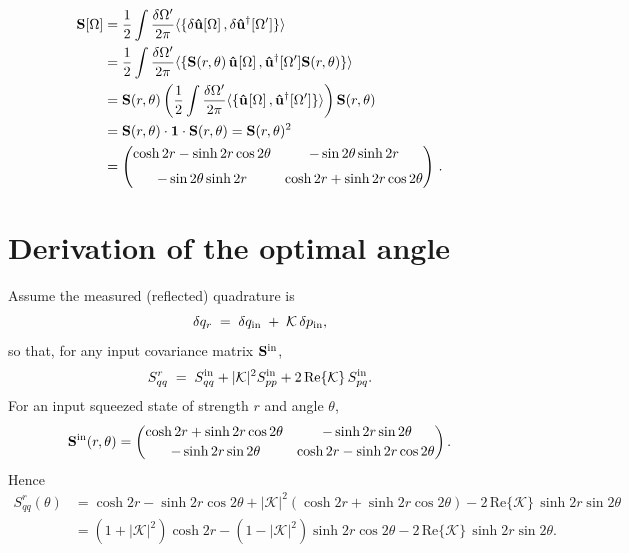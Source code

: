 \begin{align*}
  \mathbf{S}[\Omega] & =  \dfrac{1}{2}  \int \dfrac{\delta \Omega'}{2\pi} \langle\{  \delta \mathbf{\hat{u}}{\vphantom{\dagger}}[\Omega]\, , \delta \mathbf{\hat{u}}^{\dagger}[\Omega'] \}  \rangle \\
  & =  \dfrac{1}{2}  \int \dfrac{\delta \Omega'}{2\pi} \langle\{  \mathbf{S}(r, \theta) \, \mathbf{\hat{u}}^{\vphantom{\dagger}}[\Omega]\, ,  \mathbf{\hat{u}}^{\dagger}[\Omega']  \mathbf{S}(r, \theta) \}  \rangle \\
  & =  \mathbf{S}(r, \theta)  \left(  \dfrac{1}{2}  \int \dfrac{\delta \Omega'}{2\pi} \langle\{   \mathbf{\hat{u}}^{\vphantom{\dagger}}[\Omega]\, ,  \mathbf{\hat{u}}^{\dagger}[\Omega']  \}  \rangle \right)  \mathbf{S}(r, \theta)  \\
  & =  \mathbf{S}(r, \theta)  \cdot \mathbf{1}  \cdot  \mathbf{S}(r, \theta)  =  \mathbf{S}(r, \theta)^2 \\
  & = \begin{pmatrix}
  \cosh 2r - \sinh 2r \cos 2\theta & - \sin 2\theta \sinh 2r \\[6pt]
  - \sin 2\theta \sinh 2r & \cosh 2r + \sinh 2r \cos 2\theta \\
  \end{pmatrix} \,.
\end{align*}


\section*{Derivation of the optimal angle}

Assume the measured (reflected) quadrature is
\[
\delta q_r \;=\; \delta q_{\rm in} \;+\; \mathcal{K}\,\delta p_{\rm in},
\]
so that, for any input covariance matrix \(\mathbf{S}^{\rm in}\),
\[
S^{r}_{qq} \;=\; S^{\rm in}_{qq} + |\mathcal{K}|^{2}S^{\rm in}_{pp} + 2\,\mathrm{Re}\{\mathcal{K}\}\,S^{\rm in}_{pq}.
\]
For an input squeezed state of strength \(r\) and angle \(\theta\),
\[
\mathbf{S}^{\rm in}(r,\theta)=
\begin{pmatrix}
\cosh 2r + \sinh 2r \cos 2\theta & \,-\sinh 2r \sin 2\theta\\[2pt]
\,-\sinh 2r \sin 2\theta & \cosh 2r - \sinh 2r \cos 2\theta
\end{pmatrix}.
\]
Hence
\begin{align}
S^{r}_{qq}(\theta)
&= \cosh 2r - \sinh 2r \cos 2\theta
 + |\mathcal{K}|^{2}\!\left(\cosh 2r + \sinh 2r \cos 2\theta\right)
 - 2\,\mathrm{Re}\{\mathcal{K}\}\,\sinh 2r \sin 2\theta \nonumber\\[2pt]
&= (1+|\mathcal{K}|^{2})\cosh 2r
  - (1-|\mathcal{K}|^{2})\sinh 2r \cos 2\theta
  - 2\,\mathrm{Re}\{\mathcal{K}\}\,\sinh 2r \sin 2\theta .
\end{align}

